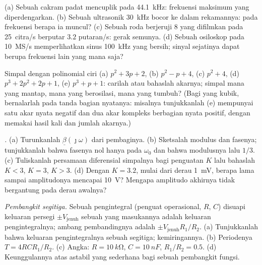 \begin{exercise}[$\star$]\label{exo:b2:feedback-oscillators:4}
(a) Sebuah cakram padat mencuplik pada \qty{44.1}{kHz}: frekuensi maksimum yang diperdengarkan. (b) Sebuah
ultrasonik \qty{30}{kHz} bocor ke dalam rekamannya: pada frekuensi berapa
ia muncul? (c) Sebuah roda berjeruji $8$ yang difilmkan pada \qty{25}{citra/s} berputar
$3.2$ putaran/s: gerak semunya. (d) Sebuah osiloskop pada \qty{10}{MS/s}
memperlihatkan sinus \qty{100}{kHz} yang bersih; sinyal sejatinya dapat berupa frekuensi
lain yang mana saja?
\end{exercise}

\begin{exercise}[$\star\star$]\label{exo:b2:feedback-oscillators:5}
Simpal dengan polinomial ciri (a) $p^2 + 3p + 2$, (b) $p^2 - p +
4$, (c) $p^2 + 4$, (d) $p^3 + 2p^2 + 2p + 1$, (e) $p^3 + p + 1$: carilah atau
bahaslah akarnya; simpal mana yang mantap, mana yang berosilasi, mana yang tumbuh?
(Bagi yang kubik, bernalarlah pada tanda bagian nyatanya: misalnya tunjukkanlah (e)
mempunyai satu akar nyata negatif dan dua akar kompleks berbagian nyata
positif, dengan memakai hasil kali dan jumlah akarnya.)
\end{exercise}

\begin{exercise}[$\star\star$]\label{exo:b2:feedback-oscillators:6}
\emph{.} (a) Turunkanlah $\underline\beta(\jmath\omega)$ dari pembaginya.
(b) Sketsalah modulus dan fasenya; tunjukkanlah bahwa fasenya nol hanya pada
$\omega_0$ dan bahwa modulusnya lalu $1/3$. (c) Tuliskanlah persamaan
diferensial simpalnya bagi penguatan $K$ lalu bahaslah $K < 3$, $K = 3$, $K > 3$.
(d) Dengan $K = 3.2$, mulai dari derau \qty{1}{mV}, berapa lama sampai
amplitudonya mencapai \qty{10}{V}? Mengapa amplitudo akhirnya tidak bergantung pada
derau awalnya?
\end{exercise}

\begin{exercise}[$\star\star$]\label{exo:b2:feedback-oscillators:7}
\emph{Pembangkit segitiga.} Sebuah pengintegral (penguat operasional, $R$, $C$) disuapi
keluaran persegi $\pm V_{\text{jenuh}}$ sebuah  yang masukannya
adalah keluaran pengintegralnya; ambang pembandingnya adalah
$\pm V_{\text{jenuh}}R_1/R_2$. (a) Tunjukkanlah bahwa keluaran pengintegralnya sebuah segitiga;
kemiringannya. (b) Periodenya $T = 4RCR_1/R_2$. (c) Angka: $R = \qty{10}{k\ohm}$,
$C = \qty{10}{nF}$, $R_1/R_2 = 0.5$. (d) Keunggulannya atas astabil yang sederhana
bagi sebuah pembangkit fungsi.
\end{exercise}

